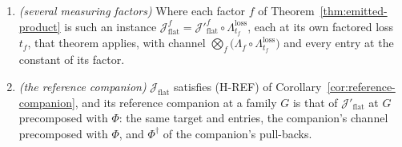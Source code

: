 \begin{corollary}
\begin{enumerate}[label=(\roman*),leftmargin=3.0em]
\begin{equation}
  \end{equation}
  with $M'$ the declared model \eqref{eq:flat-declared} of
  $\mathcal{J}'_{\mathrm{flat}}$. Where moreover the normalizer kept every
  class, the right-hand side is the family of (i) formed from $\Recv$'s
  measurement.
\item \emph{(several measuring factors)} Where each factor $f$ of
  Theorem~\ref{thm:emitted-product} is such an instance
  $\mathcal{J}^{f}_{\mathrm{flat}}=\mathcal{J}'^{f}_{\mathrm{flat}}\circ
  \Lambda^{\mathrm{loss}}_{t_f}$, each at its own factored loss $t_f$, that
  theorem applies, with channel
  $\bigotimes_f\big(\Lambda_f\circ\Lambda^{\mathrm{loss}}_{t_f}\big)$ and every
  entry at the constant of its factor.
\item \emph{(the reference companion)} $\mathcal{J}_{\mathrm{flat}}$
  satisfies (H-REF) of Corollary~\ref{cor:reference-companion}, and its
  reference companion at a family $G$ is that of
  $\mathcal{J}'_{\mathrm{flat}}$ at $G$ precomposed with $\Phi$: the same
  target and entries, the companion's channel precomposed with $\Phi$, and
  $\Phi^{\dagger}$ of the companion's pull-backs.
\end{enumerate}
\end{corollary}

